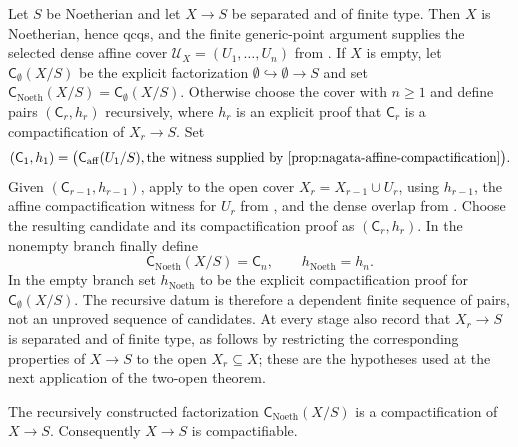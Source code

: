 \begin{definition}
  \label{def:nagata-noetherian-compactification}

  Let $S$ be Noetherian and let $X\to S$ be separated and of finite type.
  Then $X$ is Noetherian, hence qcqs, and the finite generic-point argument
  supplies the selected dense affine cover
  $\mathcal U_X=(U_1,\ldots,U_n)$ from
  .  If $X$ is empty,
  let $\mathsf C_{\emptyset}(X/S)$ be the explicit factorization
  $\emptyset\hookrightarrow\emptyset\to S$ and set
  $\mathsf C_{\mathrm{Noeth}}(X/S)=\mathsf C_{\emptyset}(X/S)$.  Otherwise
  choose the cover with $n\geq1$ and define pairs
  $(\mathsf C_r,h_r)$ recursively, where $h_r$ is an explicit proof that
  $\mathsf C_r$ is a compactification of $X_r\to S$.  Set
  \[
    (\mathsf C_1,h_1)
      =\bigl(\mathsf C_{\mathrm{aff}}(U_1/S),
        \text{the witness supplied by }
        \Cref{prop:nagata-affine-compactification}\bigr).
  \]
  Given $(\mathsf C_{r-1},h_{r-1})$, apply
   to the open cover
  $X_r=X_{r-1}\cup U_r$, using $h_{r-1}$, the affine compactification witness
  for $U_r$ from , and the dense
  overlap from .  Choose the
  resulting candidate and its compactification proof as
  $(\mathsf C_r,h_r)$.  In the nonempty branch finally define
  \[
    \mathsf C_{\mathrm{Noeth}}(X/S)=\mathsf C_n,
    \qquad h_{\mathrm{Noeth}}=h_n.
  \]
  In the empty branch set $h_{\mathrm{Noeth}}$ to be the explicit
  compactification proof for $\mathsf C_{\emptyset}(X/S)$.
  The recursive datum is therefore a dependent finite sequence of pairs, not
  an unproved sequence of candidates.  At every stage also record that
  $X_r\to S$ is separated and of finite type, as follows by restricting the
  corresponding properties of $X\to S$ to the open $X_r\subseteq X$; these
  are the hypotheses used at the next application of the two-open theorem.
\end{definition}

\begin{theorem}
  \label{thm:nagata-noetherian}

  The recursively constructed factorization
  $\mathsf C_{\mathrm{Noeth}}(X/S)$ is a compactification of $X\to S$.
  Consequently $X\to S$ is compactifiable.
\end{theorem}


